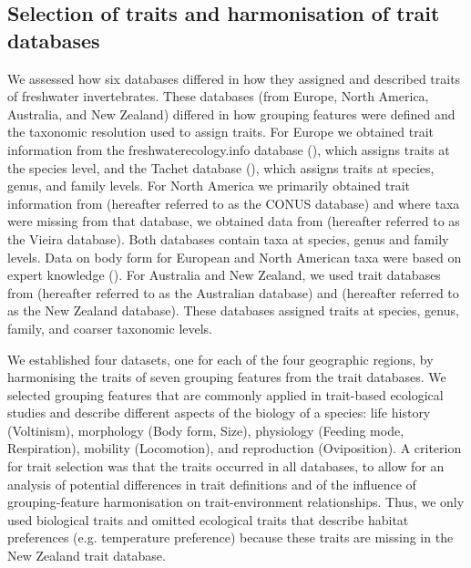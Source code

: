 \documentclass[12pt]{article}
\begin{document}
\subsection*{Selection of traits and harmonisation of trait databases}

We assessed how six databases differed in how they assigned and described traits of freshwater invertebrates. These databases (from Europe, North America, Australia, and New Zealand) differed in how grouping features were defined and the taxonomic resolution used to assign traits. For Europe we obtained trait information from the freshwaterecology.info database (\cite{schmidt-kloiber_www.freshwaterecology.info_2015}), which assigns traits at the species level, and the Tachet database (\cite{ussegliopolatera_biological_2000}), which assigns traits at species, genus, and family levels. For North America we primarily obtained trait information from \citet{twardochleb_freshwater_nodate} (hereafter referred to as the CONUS database) and where taxa were missing from that database, we obtained data from \citet{vieira_database_nodate} (hereafter referred to as the Vieira database). Both databases contain taxa at species, genus and family levels. Data on body form for European and North American taxa were based on expert knowledge (\cite{polatera_personal_information_2020}). For Australia and New Zealand, we used trait databases from \citet{keffordIntegratedDatabaseStream2020a} (hereafter referred to as the Australian database) and \citet{Philips_and_Smith_NZ_DB_2018} (hereafter referred to as the New Zealand database). These databases assigned traits at species, genus, family, and coarser taxonomic levels.

We established four datasets, one for each of the four geographic regions, by harmonising the traits of seven grouping features from the trait databases. We selected grouping features that are commonly applied in trait-based ecological studies and describe different aspects of the biology of a species: life history (Voltinism), morphology (Body form, Size), physiology (Feeding mode, Respiration), mobility (Locomotion), and reproduction (Oviposition). A criterion for trait selection was that the traits occurred in all databases, to allow for an analysis of potential differences in trait definitions and of the influence of grouping-feature harmonisation on trait-environment relationships. Thus, we only used biological traits and omitted ecological traits that describe habitat preferences (e.g. temperature preference) because these traits are missing in the New Zealand trait database.
\end{document}
